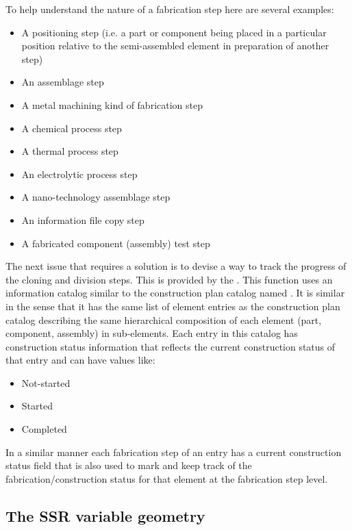 To help understand the nature of a fabrication step here are several
examples:

\begin{itemize}
\item A positioning step (i.e. a part or component being placed in a particular position relative
to the semi-assembled element in preparation of another step)
\item An assemblage step
\item A metal machining kind of fabrication step
\item A chemical process step
\item A thermal process step
\item An electrolytic process step
\item A nano-technology assemblage step
\item An information file copy step
\item A fabricated component (assembly) test step
\end{itemize}

The next issue that requires a solution is to devise a way to track the
progress of the cloning and division steps. This is provided by the
. This function uses an
information catalog similar to the construction plan catalog named
. It is similar in the sense that
it has the same list of element entries as the construction plan
catalog describing the same hierarchical composition of each element
(part, component, assembly) in sub-elements.  Each entry in this
catalog has construction status information that reflects the current
construction status of that entry and can have values like:

\begin{itemize}
\item Not-started
\item Started
\item Completed
\end{itemize}

In a similar manner each fabrication step of an entry has a current
construction status field that is also used to mark and keep track of
the fabrication/construction status for that element at the fabrication
step level.

\subsection[The SSR variable geometry]{The SSR variable geometry}

